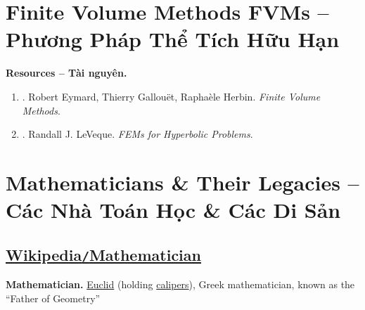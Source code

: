 \documentclass{article}
\begin{document}

\section{Finite Volume Methods FVMs -- Phương Pháp Thể Tích Hữu Hạn}
\textbf{\textsf{Resources -- Tài nguyên.}}
\begin{enumerate}
	\item \cite{Eymard_Gallouet_Herbin2019}. {\sc Robert Eymard, Thierry Gallou\"et, Rapha\`ele Herbin}. {\it Finite Volume Methods}.
	\item \cite{LeVeque2002}. {\sc Randall J. LeVeque}. {\it FEMs for Hyperbolic Problems}.
\end{enumerate}


\section{Mathematicians \& Their Legacies -- Các Nhà Toán Học \& Các Di Sản}

\subsection{\href{https://en.wikipedia.org/wiki/Mathematician}{Wikipedia\texttt{/}Mathematician}}
\textbf{Mathematician.} \href{https://en.wikipedia.org/wiki/Euclid}{Euclid} (holding \href{https://en.wikipedia.org/wiki/Calipers}{calipers}), Greek mathematician, known as the ``Father of Geometry''
\end{document}
